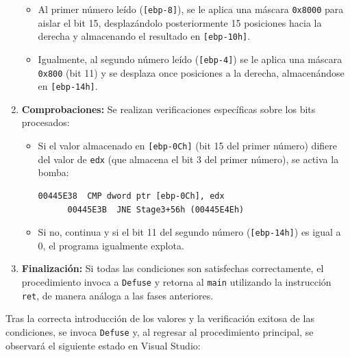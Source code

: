 \documentclass[11pt,a4paper]{article}
\begin{document}
\begin{enumerate}
\begin{itemize}
    \item Al primer número leído (\texttt{[ebp-8]}), se le aplica una máscara \texttt{0x8000} para aislar el bit 15, desplazándolo posteriormente 15 posiciones hacia la derecha y almacenando el resultado en \texttt{[ebp-10h]}.

    \item Igualmente, al segundo número leído (\texttt{[ebp-4]}) se le aplica una máscara \texttt{0x800} (bit 11) y se desplaza once posiciones a la derecha, almacenándose en \texttt{[ebp-14h]}.
  \end{itemize}
  \vspace{1ex}

  \item \textbf{Comprobaciones:} Se realizan verificaciones específicas sobre los bits procesados:
  \begin{itemize}
    \item Si el valor almacenado en \texttt{[ebp-0Ch]} (bit 15 del primer número) difiere del valor de \texttt{edx} (que almacena el bit 3 del primer número), se activa la bomba: \vspace{1ex}
    \begin{lstlisting}[style=assemblyStyle]
      00445E38  CMP dword ptr [ebp-0Ch], edx
      00445E3B  JNE Stage3+56h (00445E4Eh)
    \end{lstlisting}
    \vspace{1ex}
    \item Si no, continua y si el bit 11 del segundo número (\texttt{[ebp-14h]}) es igual a 0, el programa igualmente explota. \vspace{1ex}
  \end{itemize}

  \item \textbf{Finalización:} Si todas las condiciones son satisfechas correctamente, el procedimiento invoca a \texttt{Defuse} y retorna al \texttt{main} utilizando la instrucción \texttt{ret}, de manera análoga a las fases anteriores.
\end{enumerate}
\vspace{1ex}

\noindent Tras la correcta introducción de los valores y la verificación exitosa de las condiciones, se invoca \texttt{Defuse} y, al regresar al procedimiento principal, se observará el siguiente estado en Visual Studio:
\end{document}
